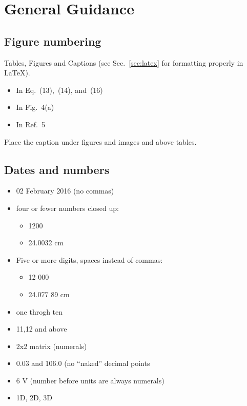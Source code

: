 \documentclass[10pt, letter]{article}
\begin{document}
\raggedbottom
\tableofcontents
\pagebreak
\section{General Guidance}\label{sec:general_guidance}

\begin{multicols}{2}
  \raggedcolumns

\subsection{Figure numbering}
Tables, Figures and Captions (see Sec.~\ref{sec:latex} for formatting
properly in \LaTeX).
\begin{itemize}
\item In Eq.~(13),~(14), and~(16)
\item In Fig.~4(a)
\item In Ref.~5
\end{itemize}
Place the caption under figures and images and above tables.

\subsection{Dates and numbers}
\label{sec:dates_and_numbers}
\begin{itemize}
\item 02 February 2016 (no commas) 
\item four or fewer numbers closed up:
  \begin{itemize}
  \item 1200
  \item 24.0032 cm
  \end{itemize}
\item Five or more digits, spaces instead of commas:
  \begin{itemize}
  \item 12 000
  \item 24.077 89 cm
  \end{itemize}
\item one throgh ten
\item 11,12 and above
\item 2x2 matrix (numerals)
\item 0.03 and 106.0 (no ``naked'' decimal points
\item 6 V (number before units are always numerals)
\item 1D, 2D, 3D
\end{itemize}


\end{multicols}
\end{document}
